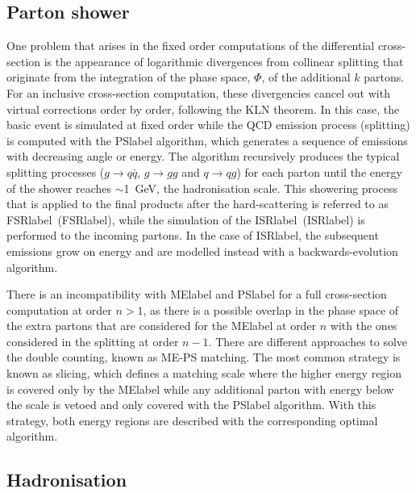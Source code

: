 \subsection{Parton shower}

One problem that arises in the fixed order computations of the differential cross-section is the appearance of logarithmic divergences from collinear splitting that originate from the integration of the phase space, $\Phi$, of the additional $k$ partons. For an inclusive cross-section computation, these divergencies cancel out with virtual corrections order by order, following the KLN theorem. %
In this case, the basic event is simulated at fixed order while the \acrshort{QCD} emission process (splitting) is computed with the \acrshort{PSlabel} algorithm, %
which generates a sequence of emissions with decreasing angle or energy. The algorithm recursively produces the typical splitting processes ($g\to q\bar{q}$, $g\to gg$ and $q\to qg$) for each parton until the energy of the shower reaches $\sim$1~GeV, the hadronisation scale. This showering process that is applied to the final products after the hard-scattering is referred to as \acrlong{FSRlabel}~(\acrshort{FSRlabel}), while the simulation of the \acrlong{ISRlabel}~(\acrshort{ISRlabel}) is performed to the incoming partons. In the case of \acrshort{ISRlabel}, the subsequent emissions grow on energy and are modelled instead with a backwards-evolution algorithm. %

There is an incompatibility with \acrshort{MElabel} and \acrshort{PSlabel} for a full cross-section computation at order $n>1$, as there is a possible overlap in the phase space of the extra partons that are considered for the \acrshort{MElabel} at order $n$ with the ones considered in the splitting at order $n-1$. There are different approaches to solve the double counting, known as ME-PS matching. The most common strategy is known as slicing, which defines a matching scale where the higher energy region is covered only by the \acrshort{MElabel} while any additional parton with energy below the scale is vetoed and only covered with the \acrshort{PSlabel} algorithm. With this strategy, both energy regions are described with the corresponding optimal algorithm.

\subsection{Hadronisation}

